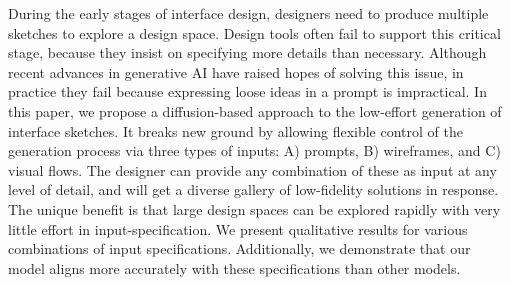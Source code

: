 
During the early stages of interface design, designers need to produce multiple sketches to explore a design space.  Design tools often fail to support this critical stage, because they insist on specifying more details than necessary. Although recent advances in generative AI have raised hopes of solving this issue, in practice they fail because expressing loose ideas in a prompt is impractical. In this paper, we propose a diffusion-based approach to the low-effort generation of interface sketches. It breaks new ground by allowing flexible control of the generation process via three types of inputs: A) prompts, B) wireframes, and C) visual flows. The designer can provide any combination of these as input at any level of detail, and will get a diverse gallery of low-fidelity solutions in response. The unique benefit is that large design spaces can be explored rapidly with very little effort in input-specification. We present qualitative results for various combinations of input specifications. Additionally, we demonstrate that our model aligns more accurately with these specifications than other models. 





